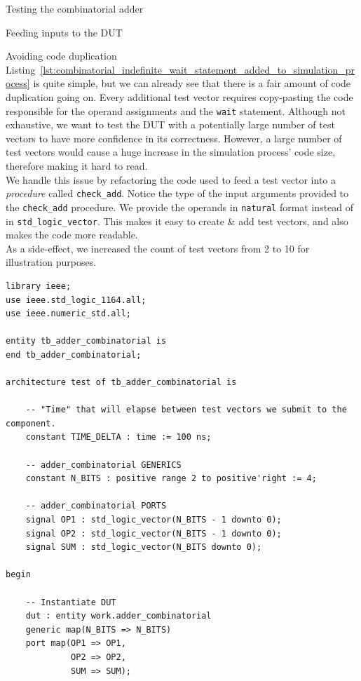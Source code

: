 \documentclass[lab]{course}
\begin{document}
\begin{section}{Testing the combinatorial adder}
\begin{subsection}{Feeding inputs to the DUT}
        \begin{subsubsection}{Avoiding code duplication}
            Listing~\ref{lst:combinatorial_indefinite_wait_statement_added_to_simulation_process} is quite simple, but we can already see that there is a fair amount of code duplication going on. Every additional test vector requires copy-pasting the code responsible for the operand assignments and the \verb+wait+ statement. Although not exhaustive, we want to test the DUT with a potentially large number of test vectors to have more confidence in its correctness. However, a large number of test vectors would cause a huge increase in the simulation process' code size, therefore making it hard to read. \\

            We handle this issue by refactoring the code used to feed a test vector into a \emph{procedure} called \verb+check_add+. Notice the type of the input arguments provided to the \verb+check_add+ procedure. We provide the operands in \verb+natural+ format instead of in \verb+std_logic_vector+. This makes it easy to create \& add test vectors, and also makes the code more readable. \\

            As a side-effect, we increased the count of test vectors from 2 to 10 for illustration purposes.

            \begin{lstlisting}[caption={Refactored test vector feeding code into a \emph{procedure} called \texttt{check\_add}}, label={lst:combinatorial_refactored_test_vector_feeding_code}]
library ieee;
use ieee.std_logic_1164.all;
use ieee.numeric_std.all;

entity tb_adder_combinatorial is
end tb_adder_combinatorial;

architecture test of tb_adder_combinatorial is

    -- "Time" that will elapse between test vectors we submit to the component.
    constant TIME_DELTA : time := 100 ns;

    -- adder_combinatorial GENERICS
    constant N_BITS : positive range 2 to positive'right := 4;

    -- adder_combinatorial PORTS
    signal OP1 : std_logic_vector(N_BITS - 1 downto 0);
    signal OP2 : std_logic_vector(N_BITS - 1 downto 0);
    signal SUM : std_logic_vector(N_BITS downto 0);

begin

    -- Instantiate DUT
    dut : entity work.adder_combinatorial
    generic map(N_BITS => N_BITS)
    port map(OP1 => OP1,
             OP2 => OP2,
             SUM => SUM);


\end{lstlisting}
\end{subsubsection}
\end{subsection}
\end{section}
\end{document}
